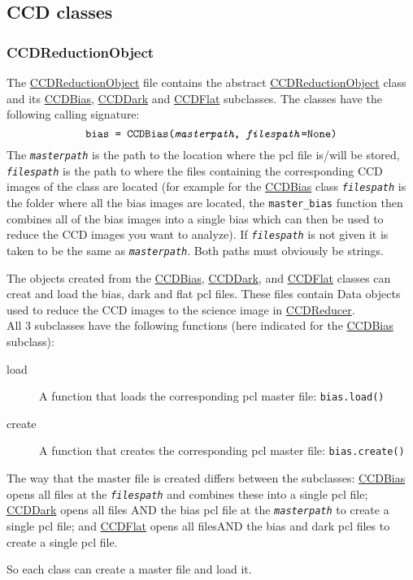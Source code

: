 \documentclass[11pt]{article}
\begin{document}
\subsection{CCD classes}
\subsubsection{CCDReductionObject}
The \ul{CCDReductionObject} file contains the abstract \ul{CCDReductionObject} class and its \ul{CCDBias}, \ul{CCDDark} and \ul{CCDFlat} subclasses. The classes have the following calling signature:
\[\texttt{bias = CCDBias(\textit{masterpath}, \textit{filespath}=None)}\]
The \texttt{\textit{masterpath}} is the path to the location where the  pcl file is/will be stored, \texttt{\textit{filespath}} is the path to where the files containing the corresponding CCD images of the class are located (for example for the \ul{CCDBias} class \texttt{\textit{filespath}} is the folder where all the bias images are located, the \texttt{master\_bias} function then combines all of the bias images into a single  bias which can then be used to reduce the CCD images you want to analyze). If \texttt{\textit{filespath}} is not given it is taken to be the same as \texttt{\textit{masterpath}}. Both paths must obviously be strings.

The objects created from the \ul{CCDBias}, \ul{CCDDark}, and \ul{CCDFlat} classes can creat and load the bias, dark and flat pcl files. These files contain Data objects used to reduce the CCD images to the science image in \ul{CCDReducer}.\\
All 3 subclasses have the following functions (here indicated for the \ul{CCDBias} subclass):
\begin{description}
\item [load] A function that loads the corresponding pcl master file: \texttt{bias.load()}
\item [create] A function that creates the corresponding pcl master file: \texttt{bias.create()}
\end{description}
The way that the master file is created differs between the subclasses: \ul{CCDBias} opens all files at the \texttt{\textit{filespath}} and combines these into a single pcl file; \ul{CCDDark} opens all files AND the  bias pcl file at the \texttt{\textit{masterpath}} to create a single pcl file; and \ul{CCDFlat} opens all filesAND the  bias and dark pcl files to create a single pcl file.

So each class can create a master file and load it.
\end{document}
